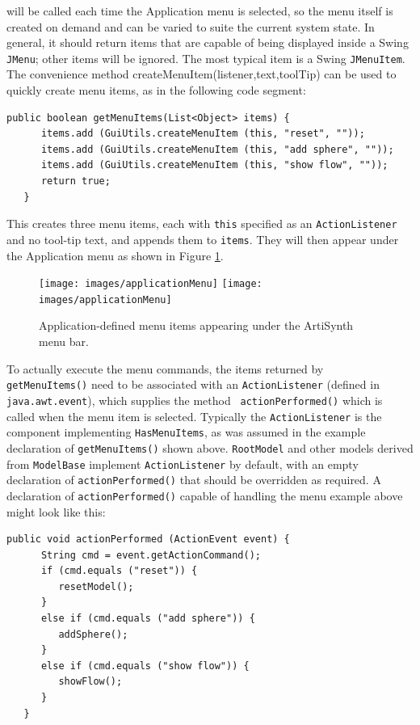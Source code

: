 will be called each time the {\sf Application} menu is selected, so the
menu itself is created on demand and can be varied to suite the
current system state. In general, it should return items that are
capable of being displayed inside a Swing {\tt JMenu}; other items
will be ignored. The most typical item is a Swing {\tt JMenuItem}.  The
convenience method
%
{createMenuItem(listener,text,toolTip)}
can be used to quickly create menu items, as in the following
code segment:
%
\begin{lstlisting}[]
   public boolean getMenuItems(List<Object> items) {
      items.add (GuiUtils.createMenuItem (this, "reset", ""));
      items.add (GuiUtils.createMenuItem (this, "add sphere", ""));
      items.add (GuiUtils.createMenuItem (this, "show flow", ""));
      return true;
   }
\end{lstlisting}
%
This creates three menu items, each with {\tt this} specified as an
{\tt ActionListener} and no tool-tip text, and appends them
to {\tt items}. They will then appear under the {\sf Application}
menu as shown in Figure \ref{applicationMenu:fig}.

\begin{figure}[t]
\begin{center}
\iflatexml
 \texttt{[image: images/applicationMenu]}
\else
 \texttt{[image: images/applicationMenu]}
\fi
\end{center}
\caption{Application-defined menu items appearing under the ArtiSynth
menu bar.}
\label{applicationMenu:fig}
\end{figure}

To actually execute the menu commands, the items returned by {\tt
getMenuItems()} need to be associated with an {\tt ActionListener}
(defined in {\tt java.awt.event}), which supplies the method {\tt
actionPerformed()} which is called when the menu item is
selected. Typically the {\tt ActionListener} is the component
implementing {\tt HasMenuItems}, as was assumed in the example
declaration of {\tt getMenuItems()} shown above. {\tt RootModel} and
other models derived from {\tt ModelBase} implement {\tt ActionListener} by
default, with an empty declaration of {\tt actionPerformed()} that
should be overridden as required.
A declaration of {\tt actionPerformed()} capable of handling the menu
example above might look like this:
%
\begin{lstlisting}[]
   public void actionPerformed (ActionEvent event) {
      String cmd = event.getActionCommand();
      if (cmd.equals ("reset")) {
         resetModel();
      }
      else if (cmd.equals ("add sphere")) {
         addSphere();
      }
      else if (cmd.equals ("show flow")) {
         showFlow();
      }
   }
\end{lstlisting}
%

